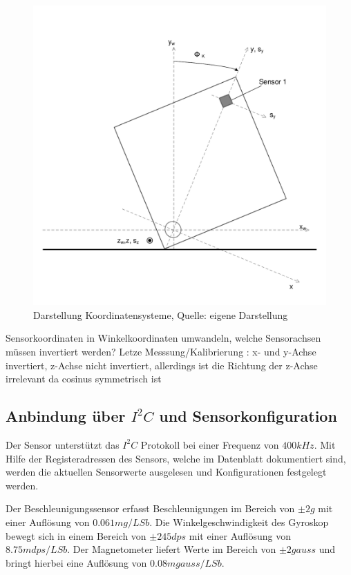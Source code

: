 \documentclass{article}
\begin{document}
\begin{figure}[h]
	\includegraphics[width=\linewidth]{Koordinatensystem}
	\caption{Darstellung Koordinatensysteme, Quelle: eigene Darstellung}
\end{figure}

Sensorkoordinaten in Winkelkoordinaten umwandeln, welche Sensorachsen müssen invertiert werden?
Letze Messsung/Kalibrierung : x- und y-Achse invertiert, z-Achse nicht invertiert, allerdings ist die Richtung der z-Achse irrelevant da cosinus symmetrisch ist

\subsection{Anbindung über $I^2C$ und Sensorkonfiguration}
Der Sensor unterstützt das $I^2C$ Protokoll bei einer Frequenz von $400k Hz$. Mit Hilfe der Registeradressen des Sensors, welche im Datenblatt dokumentiert sind, werden die aktuellen Sensorwerte ausgelesen und Konfigurationen festgelegt werden.

Der Beschleunigungssensor erfasst Beschleunigungen im Bereich von $\pm2 g$ mit einer Auflösung von $0.061 mg / LSb$. Die Winkelgeschwindigkeit des Gyroskop bewegt sich in einem Bereich von $\pm 245 dps$ mit einer Auflösung von $8.75 mdps / LSb$. Der Magnetometer liefert Werte im Bereich von $\pm 2gauss$ und bringt hierbei eine Auflösung von $0.08 mgauss / LSb$.
\end{document}
